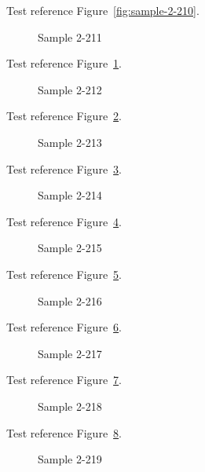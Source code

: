 Test reference Figure~\ref{fig:sample-2-210}.

\begin{figure}[tbhp]
\caption{Sample 2-211}
\label{fig:sample-2-211}
\end{figure}

Test reference Figure~\ref{fig:sample-2-211}.

\begin{figure}[tbhp]
\caption{Sample 2-212}
\label{fig:sample-2-212}
\end{figure}

Test reference Figure~\ref{fig:sample-2-212}.

\begin{figure}[tbhp]
\caption{Sample 2-213}
\label{fig:sample-2-213}
\end{figure}

Test reference Figure~\ref{fig:sample-2-213}.

\begin{figure}[tbhp]
\caption{Sample 2-214}
\label{fig:sample-2-214}
\end{figure}

Test reference Figure~\ref{fig:sample-2-214}.

\begin{figure}[tbhp]
\caption{Sample 2-215}
\label{fig:sample-2-215}
\end{figure}

Test reference Figure~\ref{fig:sample-2-215}.

\begin{figure}[tbhp]
\caption{Sample 2-216}
\label{fig:sample-2-216}
\end{figure}

Test reference Figure~\ref{fig:sample-2-216}.

\begin{figure}[tbhp]
\caption{Sample 2-217}
\label{fig:sample-2-217}
\end{figure}

Test reference Figure~\ref{fig:sample-2-217}.

\begin{figure}[tbhp]
\caption{Sample 2-218}
\label{fig:sample-2-218}
\end{figure}

Test reference Figure~\ref{fig:sample-2-218}.

\begin{figure}[tbhp]
\caption{Sample 2-219}
\label{fig:sample-2-219}
\end{figure}

